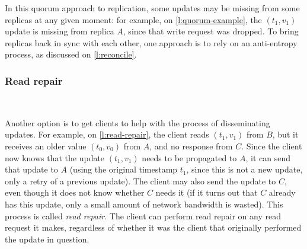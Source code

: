 In this quorum approach to replication, some updates may be missing from some replicas at any given moment: for example, on \autoref{l:quorum-example}, the $(t_1, v_1)$ update is missing from replica $A$, since that write request was dropped.
To bring replicas back in sync with each other, one approach is to rely on an anti-entropy process, as discussed on \autoref{l:reconcile}.

\begin{frame}
    \label{s:read-repair}
    \frametitle{Read repair}
    \begin{center}
    \end{center}%
    \\%
\end{frame}
\label{l:read-repair}

Another option is to get clients to help with the process of disseminating updates.
For example, on \autoref{l:read-repair}, the client reads $(t_1, v_1)$ from $B$, but it receives an older value $(t_0, v_0)$ from $A$, and no response from $C$.
Since the client now knows that the update $(t_1, v_1)$ needs to be propagated to $A$, it can send that update to $A$ (using the original timestamp $t_1$, since this is not a new update, only a retry of a previous update).
The client may also send the update to $C$, even though it does not know whether $C$ needs it (if it turns out that $C$ already has this update, only a small amount of network bandwidth is wasted).
This process is called \emph{read repair}.
The client can perform read repair on any read request it makes, regardless of whether it was the client that originally performed the update in question.

